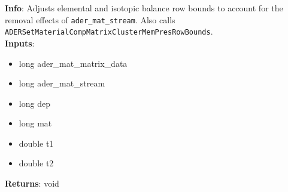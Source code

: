 \textbf{Info}: Adjusts elemental and isotopic balance row bounds to account
for the removal effects of \texttt{ader\_mat\_stream}. Also calls
\texttt{ADERSetMaterialCompMatrixClusterMemPresRowBounds}.\\

\noindent \textbf{Inputs}:
\begin{itemize}
\item{long ader\_mat\_matrix\_data}
\item{long ader\_mat\_stream}
\item{long dep}
\item{long mat}
\item{double t1}
\item{double t2}
\end{itemize}

\noindent \textbf{Returns}: void
